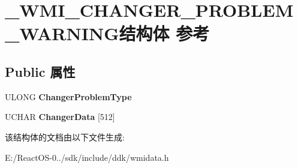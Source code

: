 \hypertarget{struct___w_m_i___c_h_a_n_g_e_r___p_r_o_b_l_e_m___w_a_r_n_i_n_g}{}\section{\+\_\+\+W\+M\+I\+\_\+\+C\+H\+A\+N\+G\+E\+R\+\_\+\+P\+R\+O\+B\+L\+E\+M\+\_\+\+W\+A\+R\+N\+I\+N\+G结构体 参考}
\label{struct___w_m_i___c_h_a_n_g_e_r___p_r_o_b_l_e_m___w_a_r_n_i_n_g}
\subsection*{Public 属性}
\begin{DoxyCompactItemize}
\item 
\mbox{\label{struct___w_m_i___c_h_a_n_g_e_r___p_r_o_b_l_e_m___w_a_r_n_i_n_g_ab16751290b41c8eb3da89035e8cafacd}} 
U\+L\+O\+NG {\bfseries Changer\+Problem\+Type}
\item 
\mbox{\label{struct___w_m_i___c_h_a_n_g_e_r___p_r_o_b_l_e_m___w_a_r_n_i_n_g_a3be2ff4ce30b76c44bbd880c01ea1adb}} 
U\+C\+H\+AR {\bfseries Changer\+Data} \mbox{[}512\mbox{]}
\end{DoxyCompactItemize}


该结构体的文档由以下文件生成\+:\begin{DoxyCompactItemize}
\item 
E\+:/\+React\+O\+S-\/0../sdk/include/ddk/wmidata.\+h\end{DoxyCompactItemize}
